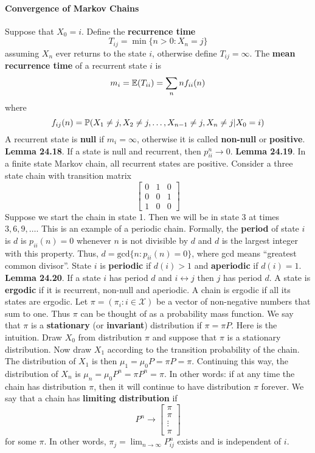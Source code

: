 \paragraph{Convergence of Markov Chains}\label{convergence-of-markov-chains}
Suppose that \(X_{0} = i\). Define the \textbf{recurrence time}
\[
T_{ij} = \min \{ n > 0 : X_{n} = j \}
\]
assuming \(X_{n}\) ever returns to the state \(i\), otherwise define
\(T_{ij} = \infty\). The \textbf{mean recurrence time} of a recurrent
state \(i\) is
\[
m_{i} = \operatorname{\mathbb{E}}(T_{ii}) = \sum_{n} n f_{ii}(n)
\]
where
\[
f_{ij}(n) = \operatorname{\mathbb{P}}(X_{1} \neq j, X_{2} \neq j, \dots, X_{n-1} \neq j, X_{n} \neq j | X_{0} = i)
\]
A recurrent state is \textbf{null} if \(m_{i} = \infty\), otherwise it is
called \textbf{non-null} or \textbf{positive}.
\textbf{Lemma 24.18}. If a state is null and recurrent, then
\(p_{ii}^{n} \rightarrow 0\).
\textbf{Lemma 24.19}. In a finite state Markov chain, all recurrent
states are positive.
Consider a three state chain with transition matrix
\[
\begin{bmatrix}
0 & 1 & 0 \\
0 & 0 & 1 \\
1 & 0 & 0
\end{bmatrix}
\]
Suppose we start the chain in state 1. Then we will be in state 3 at
times \(3, 6, 9, \dots\). This is an example of a periodic chain.
Formally, the \textbf{period} of state \(i\) is \(d\) is
\(p_{ii}(n) = 0\) whenever \(n\) is not divisible by \(d\) and \(d\) is
the largest integer with this property. Thus,
\(d = \text{gcd} \{ n : p_{ii}(n) = 0 \}\), where gcd means ``greatest
common divisor''. State \(i\) is \textbf{periodic} if \(d(i) > 1\) and
\textbf{aperiodic} if \(d(i) = 1\).
\textbf{Lemma 24.20}. If a state \(i\) has period \(d\) and
\(i \leftrightarrow j\) then \(j\) has period \(d\).
A state is \textbf{ergodic} if it is recurrent, non-null and aperiodic.
A chain is ergodic if all its states are ergodic.
Let \(\pi = (\pi_{i} : i \in \mathcal{X})\) be a vector of non-negative
numbers that sum to one. Thus \(\pi\) can be thought of as a probability
mass function.
We say that \(\pi\) is a \textbf{stationary} (or \textbf{invariant})
distribution if \(\pi = \pi P\).
Here is the intuition. Draw \(X_{0}\) from distribution \(\pi\) and
suppose that \(\pi\) is a stationary distribution. Now draw \(X_{1}\)
according to the transition probability of the chain. The distribution
of \(X_{1}\) is then \(\mu_{1} = \mu_{0} P = \pi P = \pi\). Continuing this
way, the distribution of \(X_{n}\) is
\(\mu_{n} = \mu_{0} P^{n} = \pi P^{n} = \pi\). In other words: if at any time
the chain has distribution \(\pi\), then it will continue to have
distribution \(\pi\) forever.
We say that a chain has \textbf{limiting distribution} if
\[
P^{n} \rightarrow \begin{bmatrix}
\pi \\ \pi \\ \vdots \\ \pi
\end{bmatrix}
\]
for some \(\pi\). In other words,
\(\pi_{j} = \lim_{n \rightarrow \infty} P_{ij}^{n}\) exists and is
independent of \(i\).

